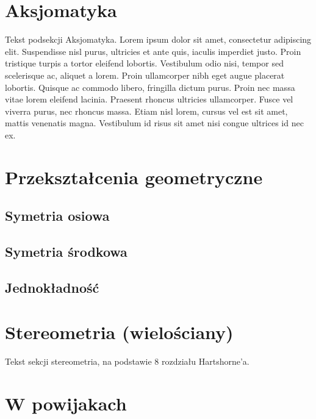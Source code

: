 \documentclass{greaseproof}
\newcommand{\loremipsum}{ {\color{gray}  Lorem ipsum dolor sit amet, consectetur adipiscing elit. Suspendisse nisl purus, ultricies et ante quis, iaculis imperdiet justo. Proin tristique turpis a tortor eleifend lobortis. Vestibulum odio nisi, tempor sed scelerisque ac, aliquet a lorem. Proin ullamcorper nibh eget augue placerat lobortis. Quisque ac commodo libero, fringilla dictum purus. Proin nec massa vitae lorem eleifend lacinia. Praesent rhoncus ultricies ullamcorper. Fusce vel viverra purus, nec rhoncus massa. Etiam nisl lorem, cursus vel est sit amet, mattis venenatis magna. Vestibulum id risus sit amet nisi congue ultrices id nec ex. } }
\begin{document}


\section{Aksjomatyka}
Tekst podsekcji Aksjomatyka. \loremipsum



\section{Przekształcenia geometryczne}
\subsection{Symetria osiowa}
\subsection{Symetria środkowa}
\subsection{Jednokładność}














\section{Stereometria (wielościany)}
Tekst sekcji stereometria, na podstawie 8 rozdziału Hartshorne'a.

\section{W powijakach}
























{}


\raggedright
{}
\printindex

\printindex[persons]
\end{document}
